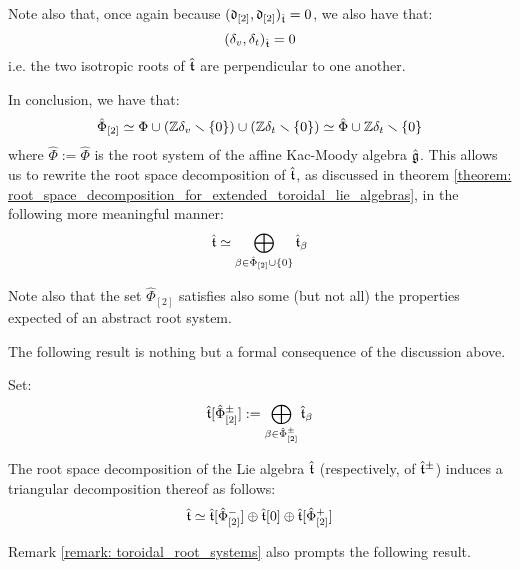 \begin{remark}
\begin{enumerate}
                Note also that, once again because $(\mathfrak{d}_{[2]}, \mathfrak{d}_{[2]})_{\hat{\mathfrak{t}}} = 0$, we also have that:
                    $$(\delta_v, \delta_t)_{\hat{\mathfrak{t}}} = 0$$
                i.e. the two isotropic roots of $\hat{\mathfrak{t}}$ are perpendicular to one another. 
            \end{enumerate}

            In conclusion, we have that:
                $$\hat{\Phi}_{[2]} \simeq \Phi \cup (\mathbb{Z} \delta_v \smallsetminus \{0\}) \cup (\mathbb{Z} \delta_t \smallsetminus \{0\}) \simeq \hat{\Phi} \cup \mathbb{Z} \delta_t \smallsetminus \{0\}$$
            where $\hat{\Phi} := \hat{\Phi}$ is the root system of the affine Kac-Moody algebra $\hat{\mathfrak{g}}$. This allows us to rewrite the root space decomposition of $\hat{\mathfrak{t}}$, as discussed in theorem \ref{theorem: root_space_decomposition_for_extended_toroidal_lie_algebras}, in the following more meaningful manner:
                $$\hat{\mathfrak{t}} \simeq \bigoplus_{\beta \in \hat{\Phi}_{[2]} \cup \{0\}} \hat{\mathfrak{t}}_{\beta}$$

            Note also that the set $\hat{\Phi}_{[2]}$ satisfies also some (but not all) the properties expected of an abstract root system. 

        \end{remark}
        The following result is nothing but a formal consequence of the discussion above.
        \begin{proposition} \label{prop: triangular_decomposition_of_extended_toroidal_lie_algebras}
            Set:
                $$\hat{\mathfrak{t}}[\hat{\Phi}_{[2]}^{\pm}] := \bigoplus_{\beta \in \hat{\Phi}_{[2]}^{\pm}} \hat{\mathfrak{t}}_{\beta}$$
        
            The root space decomposition of the Lie algebra $\hat{\mathfrak{t}}$ (respectively, of $\hat{\mathfrak{t}}^{\pm}$) induces a triangular decomposition thereof as follows:
                $$\hat{\mathfrak{t}} \simeq \hat{\mathfrak{t}}[\hat{\Phi}_{[2]}^-] \oplus \hat{\mathfrak{t}}[0] \oplus \hat{\mathfrak{t}}[\hat{\Phi}_{[2]}^+]$$
        \end{proposition}
        Remark \ref{remark: toroidal_root_systems} also prompts the following result.
